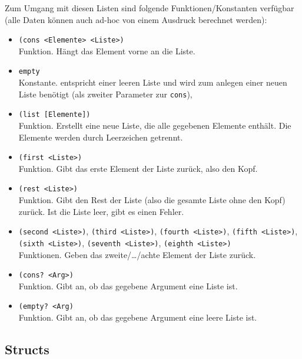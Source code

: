 	Zum Umgang mit diesen Listen sind folgende Funktionen/Konstanten verfügbar (alle Daten können auch ad-hoc von einem Ausdruck berechnet werden):
	\begin{itemize}
		\item \lstinline[language = Racket]|(cons <Elemente> <Liste>)| \\ Funktion. Hängt das Element vorne an die Liste.
		\item \lstinline[language = Racket]|empty| \\ Konstante. entspricht einer leeren Liste und wird zum anlegen einer neuen Liste benötigt (als zweiter Parameter zur \texttt{cons}),
		\item \lstinline[language = Racket]|(list [Elemente])| \\ Funktion. Erstellt eine neue Liste, die alle gegebenen Elemente enthält. Die Elemente werden durch Leerzeichen getrennt.
		\item \lstinline[language = Racket]|(first <Liste>)| \\ Funktion. Gibt das erste Element der Liste zurück, also den Kopf.
		\item \lstinline[language = Racket]|(rest <Liste>)| \\ Funktion. Gibt den Rest der Liste (also die gesamte Liste ohne den Kopf) zurück. Ist die Liste leer, gibt es einen Fehler.
		\item \lstinline[language = Racket]|(second <Liste>)|, \lstinline[language = Racket]|(third <Liste>)|, \lstinline[language = Racket]|(fourth <Liste>)|, \lstinline[language = Racket]|(fifth <Liste>)|, \lstinline[language = Racket]|(sixth <Liste>)|, \lstinline[language = Racket]|(seventh <Liste>)|, \lstinline[language = Racket]|(eighth <Liste>)| \\ Funktionen. Geben das zweite/\dots/achte Element der Liste zurück.
		\item \lstinline[language = Racket]|(cons? <Arg>)| \\ Funktion. Gibt an, ob das gegebene Argument eine Liste ist.
		\item \lstinline[language = Racket]|(empty? <Arg)| \\ Funktion. Gibt an, ob das gegebene Argument eine leere Liste ist.
	\end{itemize}

\subsection{Structs}
	\label{sec:racket_structs}

